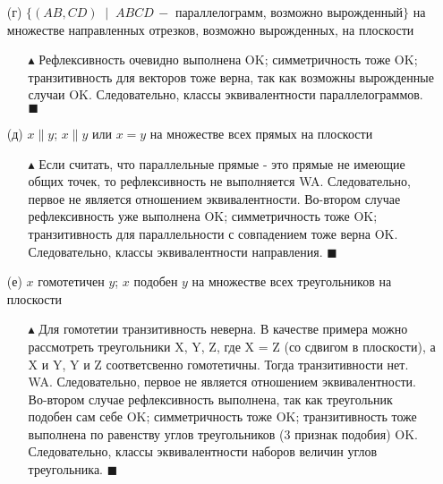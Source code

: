\begin{enumerate}
    \item[(г)] $\{ (AB, CD) \;\; | \;\; ABCD \, - $ параллелограмм, возможно вырожденный$\}$  на множестве направленных отрезков, возможно вырожденных, на плоскости
    \begin{itemize}
        \item[$\blacktriangle$] Рефлексивность очевидно выполнена {\color{ForestGreen}OK}; симметричность тоже {\color{ForestGreen}OK}; транзитивность для векторов тоже верна, так как возможны вырожденные случаи {\color{ForestGreen}OK}. Следовательно, классы эквивалентности параллелограммов. $\blacksquare$
    \end{itemize}
    \newpage
    \item[(д)] $x\|y$; $x\|y$ или $x=y$ на множестве всех прямых на плоскости
    \begin{itemize}
        \item[$\blacktriangle$] Если считать, что параллельные прямые - это прямые не имеющие общих точек, то рефлексивность не выполняется {\color{Red}WA}. Следовательно, первое не является отношением эквивалентности.
        \newline Во-втором случае рефлексивность уже выполнена {\color{ForestGreen}OK}; симметричность тоже {\color{ForestGreen}OK}; транзитивность для параллельности с совпадением тоже верна {\color{ForestGreen}OK}. Следовательно, классы эквивалентности направления. $\blacksquare$
    \end{itemize}
    
    \item[(е)] $x$ гомотетичен $y$; $x$ подобен $y$ на множестве всех треугольников на плоскости
    \begin{itemize}
        \item[$\blacktriangle$] Для гомотетии транзитивность неверна. В качестве примера можно рассмотреть треугольники X, Y, Z, где X = Z (со сдвигом в плоскости), а X и Y, Y и Z соответсвенно гомотетичны. Тогда транзитивности нет. {\color{Red}WA}. Следовательно, первое не является отношением эквивалентности.
        \newline Во-втором случае рефлексивность выполнена, так как треугольник подобен сам себе {\color{ForestGreen}OK}; симметричность тоже {\color{ForestGreen}OK}; транзитивность тоже выполнена по равенству углов треугольников (3 признак подобия) {\color{ForestGreen}OK}. Следовательно, классы эквивалентности наборов величин углов треугольника. $\blacksquare$
    \end{itemize}
    

\end{enumerate}
